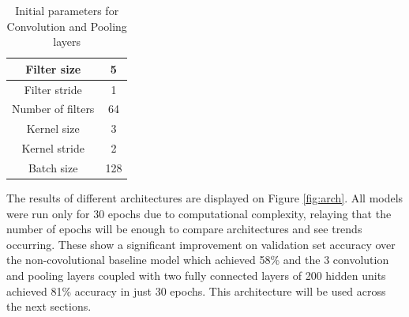 \documentclass[12pt]{article}
\begin{document}
\begin{table}[H]
\centering
\begin{tabular}[h]{| c | c |}
\hline
Filter size & 5  \\
\hline
Filter stride & 1   \\
\hline
Number of filters & 64   \\
\hline
Kernel size & 3   \\
\hline 
Kernel stride & 2   \\
\hline 
Batch size & 128   \\
\hline 
\end{tabular} 
\caption{Initial parameters for Convolution and Pooling layers}
\label{tab:convpoolpar}
\end{table}

The results of different architectures are displayed on Figure \ref{fig:arch}. All models were run only for 30 epochs due to computational complexity, relaying that the number of epochs will be enough to compare architectures and see trends occurring. These show a significant improvement on validation set accuracy over the non-covolutional baseline model which achieved 58\% and the 3 convolution and pooling layers coupled with two fully connected layers of 200 hidden units achieved 81\% accuracy in just 30 epochs. This architecture will be used across the next sections.
\end{document}
